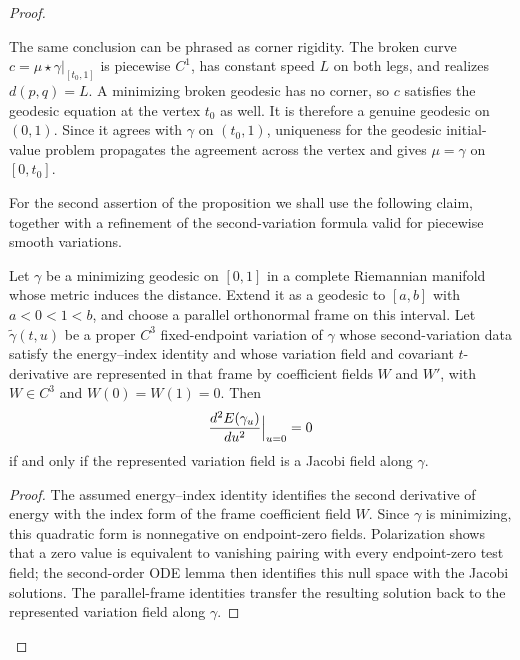 \begin{proof}
\begin{remark}
The same conclusion can be phrased as corner rigidity.  The broken curve
$c=\mu\star\gamma|_{[t_0,1]}$ is piecewise $C^1$, has constant speed $L$
on both legs, and realizes $d(p,q)=L$.  A minimizing broken geodesic has
no corner, so $c$ satisfies the geodesic equation at the vertex $t_0$ as
well.  It is therefore a genuine geodesic on $(0,1)$.  Since it agrees
with $\gamma$ on $(t_0,1)$, uniqueness for the geodesic initial-value
problem propagates the agreement across the vertex and gives
$\mu=\gamma$ on $[0,t_0]$.
\end{remark}

For the second assertion of the proposition we shall use the
following claim, together with a refinement of the second-variation
formula valid for piecewise smooth variations.

\begin{lemma}
\label{claim:second-variation-minimal-geodesic}


Let $\gamma$ be a minimizing geodesic on $[0,1]$ in a complete
Riemannian manifold whose metric induces the distance. Extend it as a
geodesic to $[a,b]$ with $a<0<1<b$, and choose a parallel orthonormal
frame on this interval. Let $\tilde\gamma(t,u)$ be a proper $C^3$
fixed-endpoint variation of $\gamma$ whose second-variation data satisfy
the energy--index identity and whose variation field and covariant
$t$-derivative are represented in that frame by coefficient fields
$W$ and $W'$, with $W\in C^3$ and $W(0)=W(1)=0$. Then
$$\frac{d^2E(\gamma_u)}{du^2}\Bigl|_{u=0}\Bigr.=0$$
if and only if the represented variation field is a Jacobi field along
$\gamma$.
\end{lemma}

\begin{proof}
\sketch
{}
The assumed energy--index identity identifies the second derivative of
energy with the index form of the frame coefficient field $W$. Since
$\gamma$ is minimizing, this quadratic form is nonnegative on
endpoint-zero fields. Polarization shows that a zero value is
equivalent to vanishing pairing with every endpoint-zero test field;
the second-order ODE lemma then identifies this null space with the
Jacobi solutions. The parallel-frame identities transfer the resulting
solution back to the represented variation field along $\gamma$.
\end{proof}



\end{proof}

